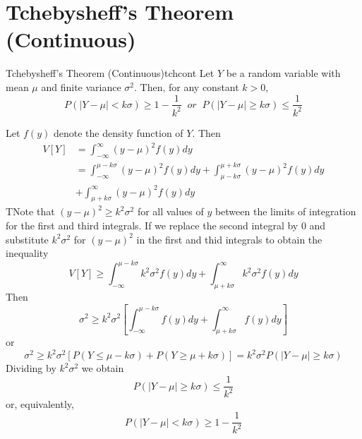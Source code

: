 \documentclass[12pt, a4paper, twoside, openright, titlepage]{book}
\begin{document}
\section{\textsection Tchebysheff's Theorem (Continuous)}

\begin{namthm}{Tchebysheff's Theorem (Continuous)}{tchcont}
    Let $Y$ be a random variable with mean $\mu$ and finite variance $\sigma^2$. Then, for any constant $k > 0$, \begin{equation*}
        P(|Y-\mu|<k\sigma) \geq 1 - \frac{1}{k^2}\;\;or\;\;P(|Y-\mu|\geq k\sigma) \leq \frac{1}{k^2}
    \end{equation*}
\end{namthm}
\begin{proof*}{}{}
    Let $f(y)$ denote the density function of $Y$. Then \begin{align*}
        V[Y] &= \int_{-\infty}^{\infty}(y-\mu)^2f(y)dy \\
        &= \int_{-\infty}^{\mu-k\sigma}(y-\mu)^2f(y)dy + \int_{\mu-k\sigma}^{\mu+k\sigma}(y-\mu)^2f(y)dy \\
        &+ \int_{\mu+k\sigma}^{\infty}(y-\mu)^2f(y)dy
    \end{align*}
    TNote that $(y-\mu)^2 \geq k^2\sigma^2$ for all values of $y$ between the limits of integration for the first and third integrals. If we replace the second integral by $0$ and substitute $k^2\sigma^2$ for $(y-\mu)^2$ in the first and thid integrals to obtain the inequality \begin{equation*}
        V[Y] \geq \int_{-\infty}^{\mu-k\sigma}k^2\sigma^2f(y)dy + \int_{\mu+k\sigma}^{\infty}k^2\sigma^2f(y)dy
    \end{equation*}
    Then \begin{equation*}
        \sigma^2 \geq k^2\sigma^2\left[\int_{-\infty}^{\mu-k\sigma}f(y)dy + \int_{\mu+k\sigma}^{\infty}f(y)dy\right]
    \end{equation*}
    or \begin{equation*}
        \sigma^2 \geq k^2\sigma^2[P(Y\leq \mu-k\sigma) +P(Y\geq \mu+k\sigma)] = k^2\sigma^2P(|Y-\mu|\geq k\sigma)
    \end{equation*}
    Dividing by $k^2\sigma^2$ we obtain \begin{equation*}
        P(|Y-\mu|\geq k\sigma) \leq \frac{1}{k^2}
    \end{equation*}
    or, equivalently, \begin{equation*}
        P(|Y-\mu| < k\sigma) \geq 1 - \frac{1}{k^2}
    \end{equation*}
\end{proof*}
\end{document}
